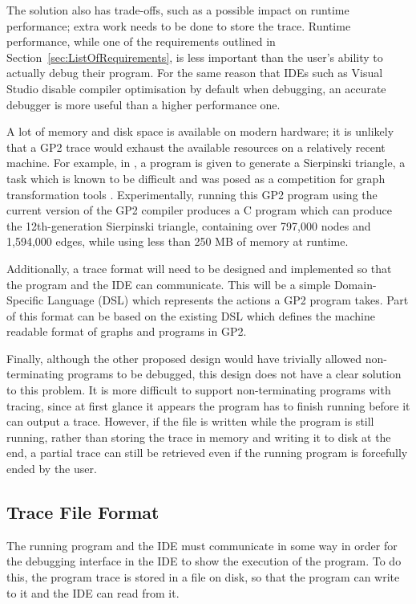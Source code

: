 \documentclass[authoryearcitations]{UoYCSproject}
\begin{document}
The solution also has trade-offs, such as a possible impact on runtime
performance; extra work needs to be done to store the trace. Runtime performance,
while one of the requirements outlined in Section~\ref{sec:ListOfRequirements},
is less important than the user's ability to actually debug their program. For
the same reason that IDEs such as Visual Studio disable compiler optimisation
by default when debugging, an accurate debugger is more useful than a higher
performance one.

A lot of memory and disk space is available on modern hardware; it is unlikely
that a GP2 trace would exhaust the available resources on a relatively recent
machine. For example, in \citep{GP2Interpreter}, a program is given to generate
a Sierpinski triangle, a task which is known to be difficult and was posed as
a competition for graph transformation tools \citep{SierpinskiCompetition}.
Experimentally, running this GP2 program using the current version of the GP2
compiler produces a C program which can produce the 12th-generation Sierpinski
triangle, containing over 797,000 nodes and 1,594,000 edges, while using less
than 250 MB of memory at runtime.

Additionally, a trace format will need to be designed and implemented so that
the program and the IDE can communicate. This will be a simple Domain-Specific
Language (DSL) which represents the actions a GP2 program takes. Part of this
format can be based on the existing DSL which defines the machine readable 
format of graphs and programs in GP2.

Finally, although the other proposed design would have trivially allowed
non-terminating programs to be debugged, this design does not have a clear
solution to this problem. It is more difficult to support non-terminating
programs with tracing, since at first glance it appears the program has to
finish running before it can output a trace. However, if the file is written
while the program is still running, rather than storing the trace in memory and
writing it to disk at the end, a partial trace can still be retrieved even if
the running program is forcefully ended by the user.


\subsection{Trace File Format}

The running program and the IDE must communicate in some way in order for the
debugging interface in the IDE to show the execution of the program. To do this,
the program trace is stored in a file on disk, so that the program can write to
it and the IDE can read from it.
\end{document}
